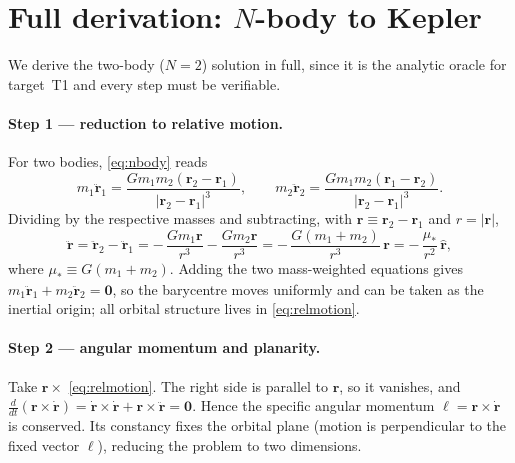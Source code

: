 \documentclass[11pt]{article}
\theoremstyle{definition}
\begin{document}
\appendix
\section{Full derivation: \texorpdfstring{$N$}{N}-body to Kepler}
\label{app:kepler}

We derive the two-body ($N=2$) solution in full, since it is the analytic
oracle for target~T1 and every step must be verifiable.

\paragraph{Step 1 --- reduction to relative motion.}
For two bodies, \eqref{eq:nbody} reads
\begin{equation}
m_1\ddot{\mathbf r}_1 = \frac{G m_1 m_2 (\mathbf r_2 - \mathbf r_1)}{|\mathbf r_2 - \mathbf r_1|^3},
\qquad
m_2\ddot{\mathbf r}_2 = \frac{G m_1 m_2 (\mathbf r_1 - \mathbf r_2)}{|\mathbf r_2 - \mathbf r_1|^3}.
\end{equation}
Dividing by the respective masses and subtracting, with
$\mathbf r \equiv \mathbf r_2 - \mathbf r_1$ and $r = |\mathbf r|$,
\begin{equation}
\ddot{\mathbf r} = \ddot{\mathbf r}_2 - \ddot{\mathbf r}_1
= -\,\frac{G m_1 \mathbf r}{r^3} - \frac{G m_2 \mathbf r}{r^3}
= -\,\frac{G(m_1+m_2)}{r^3}\,\mathbf r
= -\,\frac{\mu_{\!*}}{r^2}\,\hat{\mathbf r},
\label{eq:relmotion}
\end{equation}
where $\mu_{\!*} \equiv G(m_1+m_2)$. Adding the two mass-weighted equations gives
$m_1\ddot{\mathbf r}_1 + m_2\ddot{\mathbf r}_2 = \mathbf 0$, so the barycentre
moves uniformly and can be taken as the inertial origin; all orbital structure
lives in \eqref{eq:relmotion}.

\paragraph{Step 2 --- angular momentum and planarity.}
Take $\mathbf r \times$ \eqref{eq:relmotion}. The right side is parallel to
$\mathbf r$, so it vanishes, and
$\frac{d}{dt}(\mathbf r \times \dot{\mathbf r}) = \dot{\mathbf r}\times\dot{\mathbf r} + \mathbf r\times\ddot{\mathbf r} = \mathbf 0$.
Hence the specific angular momentum $\boldsymbol\ell = \mathbf r \times \dot{\mathbf r}$
is conserved. Its constancy fixes the orbital plane (motion is perpendicular to
the fixed vector $\boldsymbol\ell$), reducing the problem to two dimensions.
\end{document}
